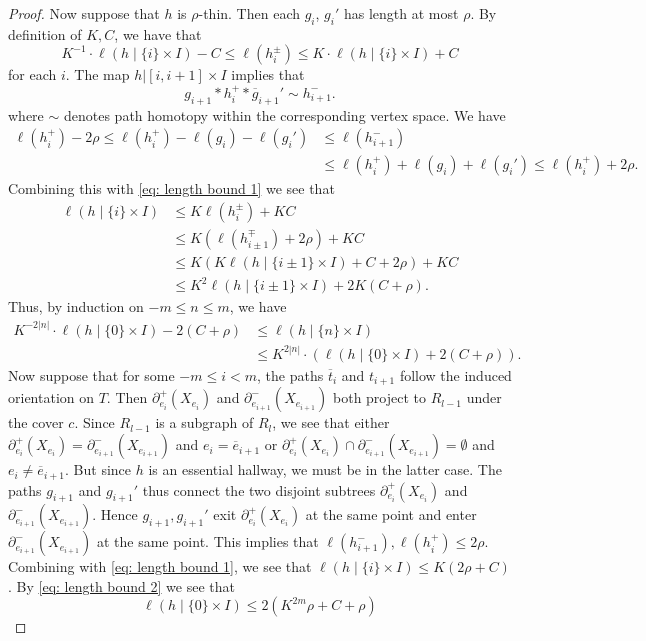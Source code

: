 \documentclass[10pt,a4paper]{amsart}
\DeclareMathOperator{\len}{\ell}
\begin{document}
\begin{proof}
Now suppose that $h$ is $\rho$-thin. Then each $g_{i}$, $g_{i}'$ has length at most $\rho$. By definition of $K, C$, we have that 
\begin{equation}
\label{eq: length bound 1}
K^{-1}\cdot \len(h\mid\{i\}\times I)  - C\leqslant \len(h_i^{\pm})\leqslant K\cdot \len(h\mid\{i\}\times I) + C
\end{equation}
for each $i$. The map $h|[i, i+1]\times I$ implies that 
\begin{equation}
\label{eq: path_homotopy}
g_{i+1}*h_i^+*\overline{g}_{i+1}'\sim h_{i+1}^-.
\end{equation}
where $\sim$ denotes path homotopy within the corresponding vertex space. We have
\begin{align*}
\len(h_i^+) - 2\rho \leqslant \len(h_i^+) - \len(g_i) - \len(g_i') &\leqslant \len(h_{i+1}^-)\\
						&\leqslant \len(h_i^+) + \len(g_i) + \len(g_i') \leqslant \len(h_i^+) + 2\rho. 
\end{align*}
Combining this with \eqref{eq: length bound 1} we see that
\begin{align*}
\len(h\mid\{i\}\times I)&\leqslant K\len(h^{\pm}_i) + KC\\
					&\leqslant K(\len(h^{\mp}_{i\pm1}) + 2\rho) + KC\\
					&\leqslant K(K\len(h\mid\{i\pm1\}\times I) + C + 2\rho) + KC\\
					&\leqslant K^2\len(h\mid\{i\pm1\}\times I) + 2K(C + \rho).
\end{align*}
Thus, by induction on $-m\leqslant n\leqslant m$, we have
\begin{align}
\label{eq: length bound 2}
K^{-2|n|}\cdot \len(h\mid\{0\}\times I) - 2(C+\rho)&\leqslant \len(h\mid\{n\}\times I)\\
\label{eq: length bound 3}				&\leqslant K^{2|n|}\cdot(\len(h\mid\{0\}\times I) + 2(C+\rho)).
\end{align}
Now suppose that for some $-m\leqslant i< m$, the paths $\overline{t}_i$ and $t_{i+1}$ follow the induced orientation on $T$. Then $\partial_{e_i}^+(X_{e_i})$ and $\partial_{e_{i+1}}^-(X_{e_{i+1}})$ both project to $R_{l-1}$ under the cover $c$. Since $R_{l-1}$ is a subgraph of $R_{l}$, we see that either $\partial_{e_i}^+(X_{e_i}) = \partial_{e_{i+1}}^-(X_{e_{i+1}})$ and $e_i = \overline{e}_{i+1}$ or $\partial_{e_i}^+(X_{e_i})\cap\partial_{e_{i+1}}^-(X_{e_{i+1}}) = \emptyset$ and $e_i\neq \overline{e}_{i+1}$. But since $h$ is an essential hallway, we must be in the latter case. The paths $g_{i+1}$ and $g_{i+1}'$ thus connect the two disjoint subtrees $\partial_{e_i}^+(X_{e_i})$ and $\partial_{e_{i+1}}^-(X_{e_{i+1}})$. Hence $g_{i+1}, g_{i+1}'$ exit $\partial_{e_i}^+(X_{e_i})$ at the same point and enter $\partial_{e_{i+1}}^-(X_{e_{i+1}})$ at the same point. This implies that $\len(h_{i+1}^-), \len(h_i^+)\leqslant 2\rho$. Combining with \eqref{eq: length bound 1}, we see that $\len(h\mid \{i\}\times I)\leqslant K(2\rho +C)$. By \eqref{eq: length bound 2} we see that
\[
\len(h\mid \{0\}\times I)\leqslant 2(K^{2m}\rho + C + \rho)
\]


\end{proof}
\end{document}
